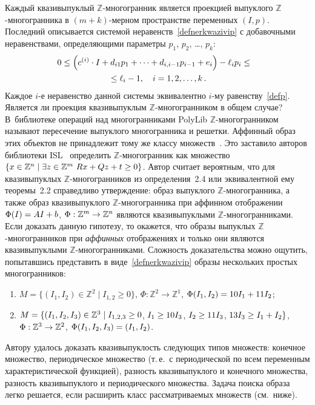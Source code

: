 \begin{multicols}{2}
Каждый квазивыпуклый $\mathbb{Z}$-мно\-го\-гран\-ник является проекцией
выпуклого $\mathbb{Z}$-мно\-го\-гран\-ника в $(m+k)$-мер\-ном
пространстве переменных $(I,p)$. Последний описывается системой
неравенств~\eqref{defnerkwazivip} с добавочными неравенствами,
определяющими параметры $p_1$, $p_2$, \dots, $p_k$:
\begin{multline}
\hspace*{-5.52576pt}0 \leq \left(c^{(i)}\cdot I + d_{i1}p_1 + \cdots + d_{i,i-1}p_{i-1} + e_i\right)- 
\ell_i p_i \leq {}\\
{}\leq\ell_i -1,\quad 
i=1,2,\ldots,k\,. 
\label{defpInequality0}
\end{multline}
Каждое $i$-е неравенство данной системы эквивалентно $i$-му
равенству~\eqref{defp}.  Является ли проекция квазивыпуклым
$\mathbb{Z}$-мно\-го\-гран\-ни\-ком в общем случае? В~библиотеке операций
над многогранниками PolyLib $\mathbb{Z}$-мно\-го\-гран\-ником называют
пересечение выпуклого многогранника и решетки. Аффинный образ этих
объектов не принадлежит тому же классу множеств~\cite{ZPolylib}. Это
заставило авторов библиотеки ISL~\cite{ISL} определить
$\mathbb{Z}$-мно\-го\-гран\-ник как множество $\{ x\in\mathbb{Z}^n \mid
\exists z\hm\in\mathbb{Z}^m\ Rx\hm+Qz\hm+t\hm\geq0 \}$. Автор считает
вероятным, что для квазивыпуклых $\mathbb{Z}$-мно\-го\-гран\-ни\-ков из
определения~2.4 или эквивалентной ему
теоремы~2.2 справедливо утверждение: образ выпуклого
$\mathbb{Z}$-мно\-го\-гран\-ника, а также образ квазивыпуклого
$\mathbb{Z}$-мно\-го\-гран\-ни\-ка при аффинном отоб\-ра\-же\-нии $\Phi(I)\hm=AI\hm+b$,
$\Phi:\mathbb{Z}^m\hm\to\mathbb{Z}^n$ являются квазивыпуклыми
$\mathbb{Z}$-мно\-го\-гран\-ни\-ка\-ми. Если доказать данную гипотезу, то
окажется, что образы вы\-пук\-лых $\mathbb{Z}$-мно\-го\-гран\-ни\-ков при
\textit{аффинных} отоб\-ра\-же\-ни\-ях и только они являются квазивыпуклыми
$\mathbb{Z}$-мно\-го\-гран\-ни\-ка\-ми. Сложность доказательства можно
ощутить, попытавшись представить в виде~\eqref{defnerkwazivip}
образы нескольких простых многогранников:
\begin{enumerate}[1)]
  \item $M=\{(I_1,I_2)\in\mathbb{Z}^2 \mid I_{1,2}\geq0\}$, 
  $\Phi:\mathbb{Z}^2\to\mathbb{Z}^1$, 
  $\Phi(I_1,I_2)\hm=10I_1\hm+11I_2$;
  \item $M=\{(I_1,I_2,I_3)\in\mathbb{Z}^3 \mid I_{1,2,3}\hm\geq0$, 
  $I_1\hm\geq10I_3$, $I_2\hm\geq11I_3$,  $13I_3\hm\geq I_1+I_2 \}$, 
  $\Phi:\mathbb{Z}^3\hm\to\mathbb{Z}^2$, $\Phi(I_1,I_2,I_3)\hm=(I_1,I_2)$.
\end{enumerate}
Автору удалось доказать квазивыпуклость следующих типов множеств:
конечное множество, периодическое множество (т.\,е.\ с периодической
по всем переменным характеристической функцией), разность
квазивыпуклого и конечного множества, разность квазивыпуклого и
периодического множества. Задача поиска образа легко решается, если
расширить класс рассматриваемых множеств (см.\ ниже).


\end{multicols}
